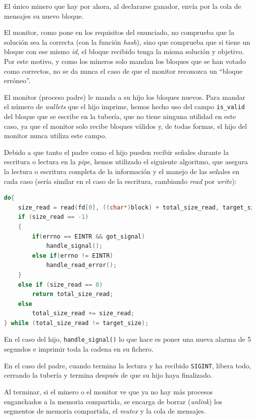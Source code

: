 \documentclass{article}
\begin{document}
    El único minero que hay por ahora, al declararse ganador, envía por la cola de mensajes su nuevo bloque.

    El monitor, como pone en los requisitos del enunciado, no comprueba que la solución sea la correcta (con la función \emph{hash}), sino que comprueba que si tiene un bloque con ese mismo \emph{id}, el bloque recibido tenga la misma solución y objetivo. Por este motivo, y como los mineros solo mandan los bloques que se han votado como correctos, no se da nunca el caso de que el monitor reconozca un ``bloque erróneo''.

    El monitor (proceso padre) le manda a su hijo los bloques nuevos. Para mandar el número de \emph{wallets} que el hijo imprime, hemos hecho uso del campo \texttt{is\_valid} del bloque que se escribe en la tubería, que no tiene ninguna utilidad en este caso, ya que el monitor solo recibe bloques válidos y, de todas formas, el hijo del monitor nunca utiliza este campo.
    
    Debido a que tanto el padre como el hijo pueden recibir señales durante la escritura o lectura en la \textit{pipe}, hemos utilizado el siguiente algoritmo, que asegura la lectura o escritura completa de la información y el manejo de las señales en cada caso (sería similar en el caso de la escritura, cambiando \emph{read} por \emph{write}):

    \begin{lstlisting}[language=C]
do{
    size_read = read(fd[0], ((char*)block) + total_size_read, target_size - total_size_read);
    if (size_read == -1)
    {
        if(errno == EINTR && got_signal)
            handle_signal();
        else if(errno != EINTR)
            handle_read_error();
    }
    else if (size_read == 0)
        return total_size_read;
    else
        total_size_read += size_read;
} while (total_size_read != target_size);\end{lstlisting}

    En el caso del hijo, \texttt{handle\_signal()} lo que hace es poner una nueva alarma de 5 segundos e imprimir toda la cadena en su fichero.

    En el caso del padre, cuando termina la lectura y ha recibido \texttt{SIGINT}, libera todo, cerrando la tubería y termina después de que su hijo haya finalizado.

    Al terminar, si el minero o el monitor ve que ya no hay más procesos enganchados a la memoria compartida, se encarga de borrar (\emph{unlink}) los segmentos de memoria compartida, el \emph{mutex} y la cola de mensajes.
\end{document}
